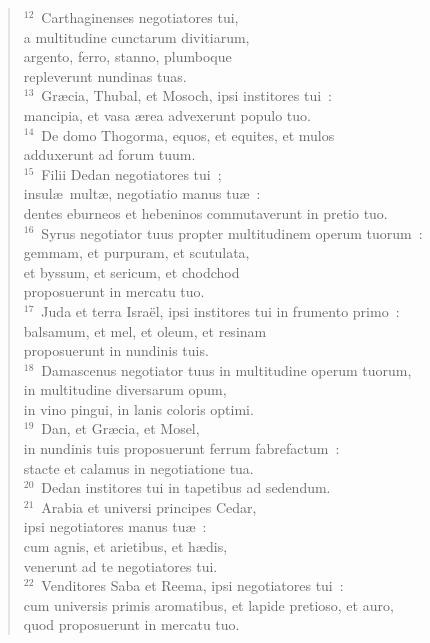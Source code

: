 \begin{flushleft}
\begin{verse}
${}^{12}$~Carthaginenses negotiatores tui,\\ a multitudine cunctarum divitiarum,\\ argento, ferro, stanno, plumboque\\ repleverunt nundinas tuas.\\
${}^{13}$~Gr\ae cia, Thubal, et Mosoch, ipsi institores tui~:\\ mancipia, et vasa \ae rea advexerunt populo tuo.\\
${}^{14}$~De domo Thogorma, equos, et equites, et mulos\\ adduxerunt ad forum tuum.\\
${}^{15}$~Filii Dedan negotiatores tui~;\\ insul\ae\ mult\ae , negotiatio manus tu\ae~:\\ dentes eburneos et hebeninos commutaverunt in pretio tuo.\\
${}^{16}$~Syrus negotiator tuus propter multitudinem operum tuorum~:\\ gemmam, et purpuram, et scutulata,\\ et byssum, et sericum, et chodchod\\ proposuerunt in mercatu tuo.\\
${}^{17}$~Juda et terra Isra\"el, ipsi institores tui in frumento primo~:\\ balsamum, et mel, et oleum, et resinam\\ proposuerunt in nundinis tuis.\\
${}^{18}$~Damascenus negotiator tuus in multitudine operum tuorum,\\ in multitudine diversarum opum,\\ in vino pingui, in lanis coloris optimi.\\
${}^{19}$~Dan, et Gr\ae cia, et Mosel,\\ in nundinis tuis proposuerunt ferrum fabrefactum~:\\ stacte et calamus in negotiatione tua.\\
${}^{20}$~Dedan institores tui in tapetibus ad sedendum.\\
${}^{21}$~Arabia et universi principes Cedar,\\ ipsi negotiatores manus tu\ae~:\\ cum agnis, et arietibus, et h\ae dis,\\ venerunt ad te negotiatores tui.\\
${}^{22}$~Venditores Saba et Reema, ipsi negotiatores tui~:\\ cum universis primis aromatibus, et lapide pretioso, et auro,\\ quod proposuerunt in mercatu tuo.\\

\end{verse}
\end{flushleft}
